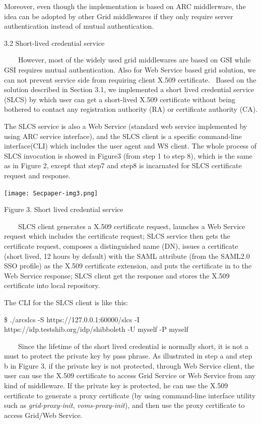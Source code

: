 \documentclass{article}
\begin{document}
Moreover, even though the implementation is based on ARC middlerware,
the idea can be adopted by other Grid middlewares if they only require
server authentication instead of mutual authentication.


\bigskip

3.2 Short-lived credential service

\ \ \ \ However, most of the widely used grid middlewares are based on
GSI while GSI requires mutual authentication. Also for Web Service
based grid solution, we can not prevent service side from requiring
client X.509 certificate. \ Based on the solution described in Section
3.1, we implemented a short lived credential service (SLCS) by which
user can get a short-lived X.509 certificate without being bothered to
contact any registration authority (RA) or certificate authority (CA).

The SLCS service is also a Web Service (standard web service implemented
by using ARC service interface), and the SLCS client is a specific
command-line interface(CLI) which includes the user agent and WS
client. The whole process of SLCS invocation is showed in Figure3 (from
step 1 to step 8), which is the same as in Figure 2, except that step7
and step8 is incarnated for SLCS certificate request and response. 


\bigskip



\begin{center}
\texttt{[image: Secpaper-img3.png]}
\end{center}
{\centering
Figure 3. Short lived credential service
\par}

\ \ \ \ SLCS client generates a X.509 certificate request, launches a
Web Service request which includes the certificate request; SLCS
service then gets the certificate request, composes a distinguished
name (DN), issues a certificate (short lived, 12 hours by default) with
the SAML attribute (from the SAML2.0 SSO profile) as the X.509
certificate extension, and puts the certificate in to the Web Service
response; SLCS client get the response and stores the X.509 certificate
into local repository.

The CLI for the SLCS client is like this:

\$ ./arcslcs -S https://127.0.0.1:60000/slcs -I
https://idp.testshib.org/idp/shibboleth -U myself -P myself

\ \ \ \ Since the lifetime of the short lived credential is normally
short, it is not a must to protect the private key by pass phrase. As
illustrated in step a and step b in Figure 3, if the private key is not
protected, through Web Service client, the user can use the X.509
certificate to access Grid Service or Web Service from any kind of
middleware. If the private key is protected, he can use the X.509
certificate to generate a proxy certificate (by using command-line
interface utility such as \textit{grid-proxy-init},
\textit{voms-}\textit{proxy-init}), and then use the proxy certificate
to access Grid/Web Service. 
\end{document}
